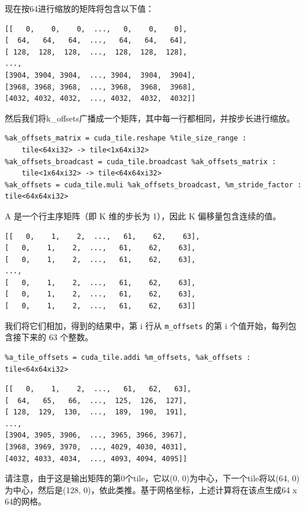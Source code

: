 \documentclass{article}
\begin{document}
现在按64进行缩放的矩阵将包含以下值：


\begin{lstlisting}
[[   0,    0,    0,  ...,   0,    0,    0],
[  64,   64,   64,  ...,   64,   64,   64],
[ 128,  128,  128,  ...,  128,  128,  128],
...,
[3904, 3904, 3904,  ..., 3904,  3904,  3904],
[3968, 3968, 3968,  ..., 3968,  3968,  3968],
[4032, 4032, 4032,  ..., 4032,  4032,  4032]]
\end{lstlisting}

然后我们将k\_offsets广播成一个矩阵，其中每一行都相同，并按步长进行缩放。


\begin{lstlisting}
%ak_offsets_matrix = cuda_tile.reshape %tile_size_range :
    tile<64xi32> -> tile<1x64xi32>
%ak_offsets_broadcast = cuda_tile.broadcast %ak_offsets_matrix :
    tile<1x64xi32> -> tile<64x64xi32>
%ak_offsets = cuda_tile.muli %ak_offsets_broadcast, %m_stride_factor : tile<64x64xi32>
\end{lstlisting}

A 是一个行主序矩阵（即 K 维的步长为 1），因此 K 偏移量包含连续的值。


\begin{lstlisting}
[[   0,    1,    2,  ...,   61,    62,    63],
[   0,    1,    2,  ...,   61,    62,    63],
[   0,    1,    2,  ...,   61,    62,    63],
...,
[   0,    1,    2,  ...,   61,    62,    63],
[   0,    1,    2,  ...,   61,    62,    63],
[   0,    1,    2,  ...,   61,    62,    63]]
\end{lstlisting}

我们将它们相加，得到的结果中，第 i 行从 \texttt{m\_offsets} 的第 i 个值开始，每列包含接下来的 63 个整数。


\begin{lstlisting}
%a_tile_offsets = cuda_tile.addi %m_offsets, %ak_offsets : tile<64x64xi32>
\end{lstlisting}

\begin{lstlisting}
[[   0,    1,    2,  ...,   61,   62,   63],
[  64,   65,   66,  ...,  125,  126,  127],
[ 128,  129,  130,  ...,  189,  190,  191],
...,
[3904, 3905, 3906,  ..., 3965, 3966, 3967],
[3968, 3969, 3970,  ..., 4029, 4030, 4031],
[4032, 4033, 4034,  ..., 4093, 4094, 4095]]
\end{lstlisting}

请注意，由于这是输出矩阵的第0个tile，它以(0, 0)为中心，下一个tile将以(64, 0)为中心，然后是(128, 0)，依此类推。基于网格坐标，上述计算将在该点生成64 x 64的网格。
\end{document}
